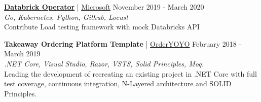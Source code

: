\documentclass[margin, 10pt, hidelinks]{res} %
\newcommand{\tab}{\hspace*{1em}} %
\newcommand{\emphasize}{\bf} %
\begin{document}
\begin{resume}
\href{https://github.com/microsoft/azure-databricks-operator/pull/173}{\emphasize\underline{Databrick Operator}} | \href{https://www.microsoft.com/}{\underline{Microsoft}} \hfill November 2019  - March 2020 \\
{\it Go, Kubernetes, Python, Github, Locust} \\
\tab Contribute Load testing framework with mock Databricks API


{\emphasize Takeaway Ordering Platform Template} | \href{https://orderyoyo.com/}{\underline{OrderYOYO}} \hfill February 2018  - March 2019 \\
{\it .NET Core, Visual Studio, Razor, VSTS, Solid Principles, Moq.} \\
\tab Leading the development of recreating an existing project in .NET Core with full test coverage, continuous integration, N-Layered architecture and SOLID Principles.





\end{resume}
\end{document}
